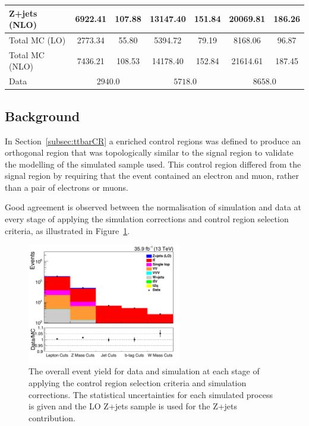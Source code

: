 \begin{table}[p]
\begin{tabular}{l S[table-format=5.4] @{${}\pm{}$} S[table-format=3.3] S[table-format=5.4] @{${}\pm{}$} S[table-format=3.3] S[table-format=5.3] @{${}\pm{}$} S[table-format=3.2]}
Z+jets (NLO) & 6922.41 & 107.88 & 13147.40 & 151.84 & 20069.81 & 186.26    \\
\hline
Total MC (LO) & 2773.34 & 55.80 & 5394.72 & 79.19 & 8168.06 & 96.87    \\
Total MC (NLO) & 7436.21 & 108.53 & 14178.40 & 152.84 & 21614.61 & 187.45    \\
\hline
Data &  &  &     \\
\hline
\end{tabular}
\end{table}


\newpage
\subsection{\ttbar Background}\label{subsec:ttbarEstimation}
In Section~\ref{subsec:ttbarCR} a \ttbar enriched control regions was defined to produce an orthogonal region that was topologically similar to the signal region to validate the modelling of the simulated \ttbar sample used.
This control region differed from the signal region by requiring that the event contained an electron and muon, rather than a pair of electrons or muons.

Good agreement is observed between the normalisation of simulation and data at every stage of applying the simulation corrections and control region selection criteria, as illustrated in Figure~\ref{fig:ttbar_cutFlow}.

\begin{figure}[!h]
\centering
\includegraphics[width=0.6\textwidth]{figs/background-estimation/plots/unblinded/ttbar_control/cutFlow_log.pdf}
\caption{
The overall event yield for data and simulation at each stage of applying the \ttbar control region selection criteria and simulation corrections. The statistical uncertainties for each simulated process is given and the LO Z+jets sample is used for the Z+jets contribution.
}
\label{fig:ttbar_cutFlow}
\end{figure}


